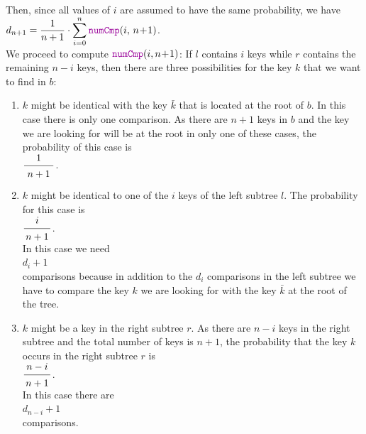 \\[0.2cm]
Then, since all values of $i$ are assumed to have the same probability, we have
\\[0.2cm]
\hspace*{1.3cm}
$\ds d_{n+1} =  \frac{1}{n+1} \cdot \sum\limits_{i=0}^n \mytt{numCmp}(i,\, n\!+\!1)$.
\\[0.2cm]
We proceed to compute $\mytt{numCmp}(i,n\!+\!1)$:
If  $l$ contains $i$ keys while $r$ contains the remaining $n-i$ keys,
then there are three possibilities for the key $k$ that we want to find in $b$:
\begin{enumerate}
\item $k$ might be identical with the key $\bar{k}$ that is located at the root of $b$.
      In this case there is only one comparison.
      As there  are $n+1$ keys in $b$ and the key we are looking for will be at the root in only
      one of these cases, the probability of this case is
      \\[0.2cm]
      \hspace*{1.3cm} $\bruch{1}{\,n+1\,}$.

\item $k$ might be identical to one of the  $i$ keys of the left subtree $l$.
      The probability for this case is 
      \\[0.2cm]
      \hspace*{1.3cm} $\displaystyle\bruch{i}{n+1}$. \\[0.2cm]
      In this case we need 
      \\[0.2cm]
      \hspace*{1.3cm} $\displaystyle d_i + 1$ \\[0.2cm]
      comparisons because in addition to the  $d_i$ comparisons in the left subtree we have to
      compare the key $k$ we are looking for with the key $\bar{k}$ at the root of the tree.
\item $k$ might be a key in the right subtree $r$.  As there are  $n-i$ keys in the right subtree
      and the total number of keys is $n+1$, the probability that the key  $k$ occurs in the right subtree $r$
      is \\[0.2cm]
      \hspace*{1.3cm} $\displaystyle \bruch{n-i}{n+1}$. \\[0.2cm]
      In this case there are  \\[0.2cm]
      \hspace*{1.3cm} $\displaystyle d_{n-i} + 1$ \\[0.2cm]
      comparisons. 
\end{enumerate}
